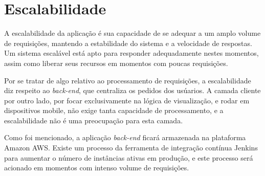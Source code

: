 \section{Escalabilidade}

A escalabilidade da aplicação é sua capacidade de se adequar a um
amplo volume de requisições, mantendo a estabilidade do sistema e a
velocidade de respostas. Um sistema escalável está apto para responder
adequadamente nestes momentos, assim como liberar seus recursos em
momentos com poucas requisições.

Por se tratar de algo relativo ao processamento de requisições, a
escalabilidade diz respeito ao \emph{back-end}, que centraliza os
pedidos dos usúarios. A camada cliente por outro lado, por focar
exclusivamente na lógica de visualização, e rodar em dispositivos
mobile, não exige tanta capacidade de processamento, e a
escalabilidade não é uma preocupação para esta camada.

Como foi mencionado, a aplicação \emph{back-end} ficará armazenada na
plataforma Amazon AWS. Existe um processo da ferramenta de integração
contínua Jenkins para aumentar o número de instâncias ativas em
produção, e este processo será acionado em momentos com intenso volume
de requisições.


